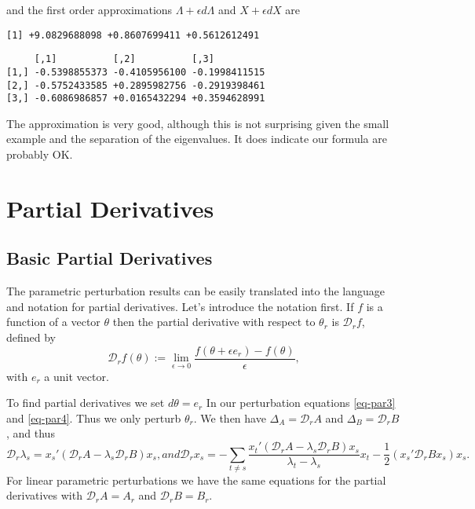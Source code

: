 \documentclass[
  12pt,
  letterpaper,
  DIV=11,
  numbers=noendperiod]{scrartcl}
\newcommand{\sectionbreak}{\clearpage}
\newcommand{\eps}{\epsilon}
\begin{document}
and the first order approximations \(\Lambda+\eps d\Lambda\) and
\(X+\eps dX\) are

\begin{verbatim}
[1] +9.0829688098 +0.8607699411 +0.5612612491
\end{verbatim}

\begin{verbatim}
     [,1]          [,2]          [,3]         
[1,] -0.5398855373 -0.4105956100 -0.1998411515
[2,] -0.5752433585 +0.2895982756 -0.2919398461
[3,] -0.6086986857 +0.0165432294 +0.3594628991
\end{verbatim}

The approximation is very good, although this is not surprising given
the small example and the separation of the eigenvalues. It does
indicate our formula are probably OK.

\sectionbreak

\section{Partial Derivatives}\label{sec-partial}

\subsection{Basic Partial Derivatives}\label{sec-parbasic}

The parametric perturbation results can be easily translated into the
language and notation for partial derivatives. Let's introduce the
notation first. If \(f\) is a function of a vector \(\theta\) then the
partial derivative with respect to \(\theta_r\) is \(\mathcal{D}_rf\),
defined by \[
\mathcal{D}_rf(\theta):=\lim_{\epsilon\rightarrow 0}\frac{f(\theta+\epsilon e_r)-f(\theta)}{\epsilon},
\] with \(e_r\) a unit vector.

To find partial derivatives we set \(d\theta=e_r\) In our perturbation
equations \eqref{eq-par3} and \eqref{eq-par4}. Thus we only perturb
\(\theta_r\). We then have \(\Delta_A=\mathcal{D}_rA\) and
\(\Delta_B=\mathcal{D}_rB\), and thus \begin{subequations}
\begin{equation}
\mathcal{D}_r\lambda_s=x_s'(\mathcal{D}_rA-\lambda_s\mathcal{D}_rB)x_s,\label{eq-parper1}
\end{equation}
and
\begin{equation}
\mathcal{D}_rx_s=-\sum_{t\not= s}\frac{x_t'(\mathcal{D}_rA-\lambda_s\mathcal{D}_rB)x_s}{\lambda_t-\lambda_s}x_t-\frac12(x_s'\mathcal{D}_rBx_s)x_s.\label{eq-parper2}
\end{equation}
\end{subequations} For linear parametric perturbations we have the same
equations for the partial derivatives with \(\mathcal{D}_rA=A_r\) and
\(\mathcal{D}_rB=B_r\).
\end{document}
